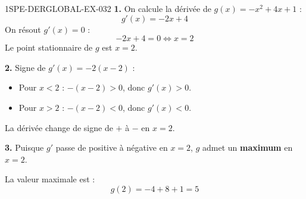\begin{corrige}{1SPE-DERGLOBAL-EX-032}
\textbf{1.} On calcule la dérivée de $g(x) = -x^2 + 4x + 1$ :
\[
g'(x) = -2x + 4
\]
On résout $g'(x) = 0$ :
\[
-2x + 4 = 0 \iff x = 2
\]
Le point stationnaire de $g$ est $x = 2$.

\textbf{2.} Signe de $g'(x) = -2(x - 2)$ :
\begin{itemize}
\item Pour $x < 2$ : $-(x-2) > 0$, donc $g'(x) > 0$.
\item Pour $x > 2$ : $-(x-2) < 0$, donc $g'(x) < 0$.
\end{itemize}
La dérivée change de signe de $+$ à $-$ en $x = 2$.

\textbf{3.} Puisque $g'$ passe de positive à négative en $x = 2$, $g$ admet un \textbf{maximum} en $x = 2$.

La valeur maximale est :
\[
g(2) = -4 + 8 + 1 = \boxed{5}
\]
\end{corrige}

